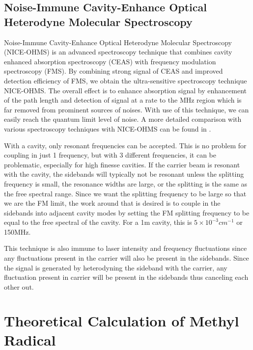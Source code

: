 \documentclass[11pt,a4paper]{book}
\begin{document}
		\subsection{Noise-Immune Cavity-Enhance Optical Heterodyne Molecular Spectroscopy}
			\label{subsec:Noise-Immune Cavity-Enhance Optical Heterodyne Molecular Spectroscopy}
			Noise-Immune Cavity-Enhance Optical Heterodyne Molecular Spectroscopy (NICE-OHMS) is an advanced spectroscopy technique that combines cavity enhanced absorption spectroscopy (CEAS) with frequency modulation spectroscopy (FMS). By combining strong signal of CEAS and improved detection efficiency of FMS, we obtain the ultra-sensitive spectroscopy technique NICE-OHMS. The overall effect is to enhance absorption signal by enhancement of the path length and detection of signal at a rate to the MHz region which is far removed from prominent sources of noises. With use of this technique, we can easily reach the quantum limit level of noise.
			A more detailed comparison with various spectroscopy techniques with NICE-OHMS can be found in \cite{NICE-OHMS}.
			
			With a cavity, only resonant frequencies can be accepted. This is no problem for coupling in just 1 frequency, but with 3 different frequencies, it can be problematic, especially for high finesse cavities.  If the carrier beam is resonant with the cavity, the sidebands will typically not be resonant unless the splitting frequency is small, the resonance widths are large, or the splitting is the same as the free spectral range. Since we want the splitting frequency to be large so that we are the FM limit, the work around that is desired is to couple in the sidebands into adjacent cavity modes by setting the FM splitting frequency to be equal to the free spectral of the cavity. For a 1m cavity, this is $5\times 10^{-3} cm^{-1}$ or 150MHz.
			
			This technique is also immune to laser intensity and frequency fluctuations since any fluctuations present in the carrier will also be present in the sidebands. Since the signal is generated by heterodyning the sideband with the carrier, any fluctuation present in carrier will be present in the sidebands thus canceling each other out.
	\section{Theoretical Calculation of Methyl Radical}
	\label{sec:Theoretical Calculation of Methyl Radical}
\end{document}
